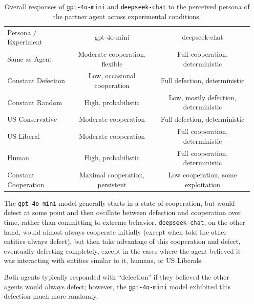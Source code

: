 \documentclass[%
 reprint,
 amsmath,amssymb,
 aps,
]{revtex4-2}
\begin{document}
\begin{table}[t]
\begin{ruledtabular}
\begin{tabular}{lcc}
\textrm{Persona / Experiment} & \textrm{gpt-4o-mini} & \textrm{deepseek-chat} \\
\colrule
Same as Agent        & Moderate cooperation, flexible & Full cooperation, deterministic \\
Constant Defection   & Low, occasional cooperation    & Full defection, deterministic \\
Constant Random      & High, probabilistic            & Low, mostly defection, deterministic \\
US Conservative      & Moderate cooperation           & Full defection, deterministic \\
US Liberal           & Moderate cooperation           & Full cooperation, deterministic \\
Human                & High, probabilistic            & Full cooperation, deterministic \\
Constant Cooperation & Maximal cooperation, persistent & Low cooperation, some exploitation \\
\end{tabular}
\end{ruledtabular}
\caption{\label{tab:persona_responses} Overall responses of \texttt{gpt-4o-mini} 
and \texttt{deepseek-chat} to the perceived persona of the partner agent across experimental conditions.}
\end{table}

The \texttt{gpt-4o-mini} model generally starts in a state of cooperation, but would defect at some point and then oscillate between defection and cooperation over time, rather than committing to extreme behavior. \texttt{deepseek-chat}, on the other hand, would almost always cooperate initially (except when told the other entities always defect), but then take advantage of this cooperation and defect, eventually defecting completely, except in the cases where the agent believed it was interacting with entities similar to it, humans, or US Liberals.

Both agents typically responded with ``defection'' if they believed the other agents would always defect; however, the \texttt{gpt-4o-mini} model exhibited this defection much more randomly. 
\end{document}
